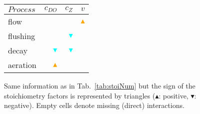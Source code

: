 \documentclass[a4paper,10pt]{article}
\begin{document}
\begin{figure}[!h]
  \begin{center}
  \begin{tabular}{lrrr}\hline
    $Process$ & $c_{DO}$ & $c_Z$ & $v$ \\ \hline
    flow &  &  & \textcolor{orange}{$\blacktriangle$} \\
    flushing &  & \textcolor{cyan}{$\blacktriangledown$} &  \\
    decay & \textcolor{cyan}{$\blacktriangledown$} & \textcolor{cyan}{$\blacktriangledown$} &  \\
    aeration & \textcolor{orange}{$\blacktriangle$} &  &  \\ \hline
  \end{tabular}  \end{center}
  \caption{Same information as in Tab.~\ref{tab:stoiNum} but the sign of the stoichiometry factors is represented by triangles ($\blacktriangle$: positive, $\blacktriangledown$: negative). Empty cells denote missing (direct) interactions. \label{fig:stoiSymb}}
\end{figure}
\end{document}
